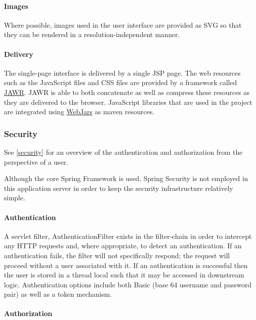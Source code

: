 \paragraph{Images}

Where possible, images used in the user interface are provided as SVG so that they can be rendered in a resolution-independent manner.

\paragraph{Delivery}

The single-page interface is delivered by a single JSP page.  The web resources such as the JavaScript files and CSS files are provided by a framework called \href{https://jawr.java.net/}{JAWR}.  JAWR is able to both concatenate as well as compress these resources as they are delivered to the browser.  JavaScript libraries that are used in the project are integrated using \href{http://www.webjars.org/}{WebJars} as maven resources.

\subsubsection{Security}

See \ref{security} for an overview of the authentication and authorization from the perspective of a user.

Although the core Spring Framework is used, Spring Security is not employed in this application server in order to keep the security infrastructure relatively simple.

\paragraph{Authentication}

A servlet filter, AuthenticationFilter exists in the filter-chain in order to intercept any HTTP requests and, where appropriate, to detect an authentication.  If an authentication fails, the filter will not specifically respond; the request will proceed without a user associated with it.  If an authentication is successful then the user is stored in a thread local such that it may be accessed in downstream logic.  Authentication options include both Basic (base 64 username and password pair) as well as a token mechanism.

\paragraph{Authorization}

